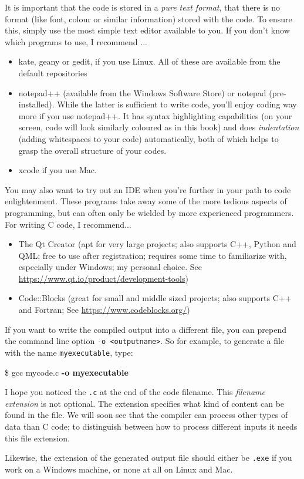 \begin{hintbox}
It is important that the code is stored in a \emph{pure text format}, \ie that there is no format (like font, colour or similar information) stored with the code. To ensure this, simply use the most simple text editor available to you. If you don't know which programs to use, I recommend ...
\begin{itemize}
\item kate, geany or gedit, if you use Linux. All of these are available from the default repositories
\item notepad++ (available from the Windows Software Store) or notepad (pre-installed). While the latter is sufficient to write code, you'll enjoy coding way more if you use notepad++.
	It has syntax highlighting capabilities (\ie on your screen, code will look similarly coloured as in this book) and does
	\emph{indentation} (adding whitespaces to your code) automatically, both of which helps to grasp the overall structure of your codes.
\item xcode if you use Mac.
\end{itemize}

You may also want to try out an IDE when you're further in your path to code enlightenment. These programs take away some of the more tedious aspects of programming, but can often only be wielded by more experienced programmers. For writing C code, I recommend...
\begin{itemize}
\item The Qt Creator (apt for very large projects; also supports C++, Python and QML; free to use after registration; requires some time to familiarize with, especially under Windows;
	my personal choice. See \url{https://www.qt.io/product/development-tools})
\item Code::Blocks (great for small and middle sized projects; also supports C++ and Fortran;  See \url{https://www.codeblocks.org/})
\end{itemize}
\end{hintbox}

If you want to write the compiled output into a different file, you can prepend the command line option \texttt{-o <outputname>}. So for example, to generate a file with the name \texttt{myexecutable}, type:
\begin{cmdbox}
\$ gcc mycode.c \textbf{-o myexecutable}
\end{cmdbox}

\begin{hintbox}
I hope you noticed the \texttt{.c} at the end of the code filename. This \emph{filename extension} is not optional. The extension specifies what kind of content can be found in the file. We will soon see that the compiler can process other types of data than C code; to distinguish between how to process different inputs it needs this file extension.

Likewise, the extension of the generated output file should either be \texttt{.exe} if you work on a Windows machine, or none at all on Linux and Mac.
\end{hintbox}

